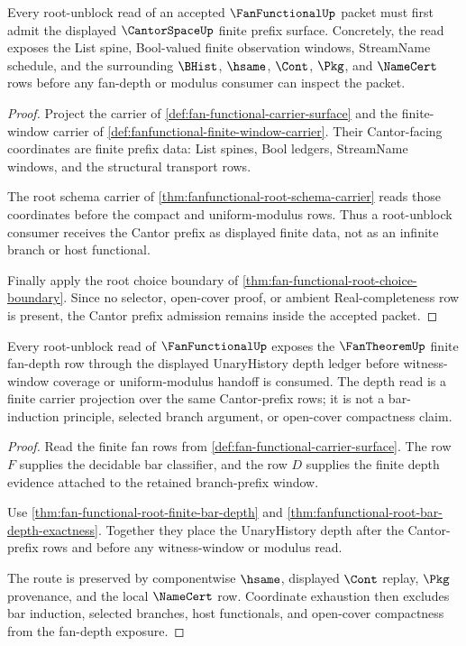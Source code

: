 \begin{theorem}
\label{thm:fanfunctional-root-unblock-cantor-prefix}
Every root-unblock read of an accepted $\FanFunctionalUp$ packet must first admit the displayed $\CantorSpaceUp$ finite prefix surface. Concretely, the read exposes the List spine, Bool-valued finite observation windows, StreamName schedule, and the surrounding $\BHist$, $\hsame$, $\Cont$, $\Pkg$, and $\NameCert$ rows before any fan-depth or modulus consumer can inspect the packet.
\end{theorem}
\begin{proof}
Project the carrier of \autoref{def:fan-functional-carrier-surface} and the finite-window carrier of \autoref{def:fanfunctional-finite-window-carrier}. Their Cantor-facing coordinates are finite prefix data: List spines, Bool ledgers, StreamName windows, and the structural transport rows.

The root schema carrier of \autoref{thm:fanfunctional-root-schema-carrier} reads those coordinates before the compact and uniform-modulus rows. Thus a root-unblock consumer receives the Cantor prefix as displayed finite data, not as an infinite branch or host functional.

Finally apply the root choice boundary of \autoref{thm:fan-functional-root-choice-boundary}. Since no selector, open-cover proof, or ambient Real-completeness row is present, the Cantor prefix admission remains inside the accepted packet.
\end{proof}

\begin{theorem}
\label{thm:fanfunctional-root-unblock-fan-depth}
Every root-unblock read of $\FanFunctionalUp$ exposes the $\FanTheoremUp$ finite fan-depth row through the displayed UnaryHistory depth ledger before witness-window coverage or uniform-modulus handoff is consumed. The depth read is a finite carrier projection over the same Cantor-prefix rows; it is not a bar-induction principle, selected branch argument, or open-cover compactness claim.
\end{theorem}
\begin{proof}
Read the finite fan rows from \autoref{def:fan-functional-carrier-surface}. The row $F$ supplies the decidable bar classifier, and the row $D$ supplies the finite depth evidence attached to the retained branch-prefix window.

Use \autoref{thm:fan-functional-root-finite-bar-depth} and \autoref{thm:fanfunctional-root-bar-depth-exactness}. Together they place the UnaryHistory depth after the Cantor-prefix rows and before any witness-window or modulus read.

The route is preserved by componentwise $\hsame$, displayed $\Cont$ replay, $\Pkg$ provenance, and the local $\NameCert$ row. Coordinate exhaustion then excludes bar induction, selected branches, host functionals, and open-cover compactness from the fan-depth exposure.
\end{proof}

